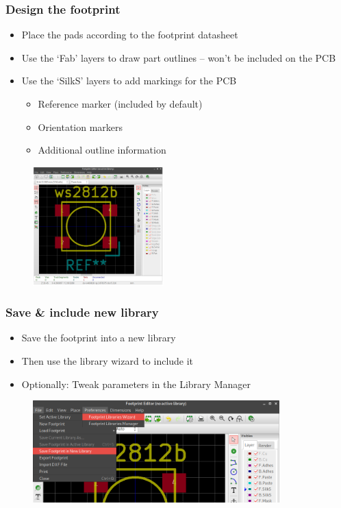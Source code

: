 \documentclass{beamer}
\begin{document}
\begin{frame}
  \frametitle{Design the footprint}
  \begin{itemize}
    \item Place the pads according to the footprint datasheet
    \item Use the `Fab' layers to draw part outlines – won't be included on the PCB
    \item Use the `SilkS' layers to add markings for the PCB
    \begin{itemize}
      \item Reference marker (included by default)
      \item Orientation markers
      \item Additional outline information
    \end{itemize}
  \end{itemize}
  \begin{figure}[H]
    \centering
    \includegraphics[width=0.45\textwidth]{images/step_06.png}
  \end{figure}
\end{frame}


\begin{frame}
  \frametitle{Save \& include new library}
  \begin{itemize}
    \item Save the footprint into a new library
    \item Then use the library wizard to include it
    \item Optionally: Tweak parameters in the Library Manager
  \end{itemize}
  \begin{figure}[H]
    \centering
    \includegraphics[width=0.85\textwidth]{images/step_07_08.png}
  \end{figure}
\end{frame}
\end{document}
